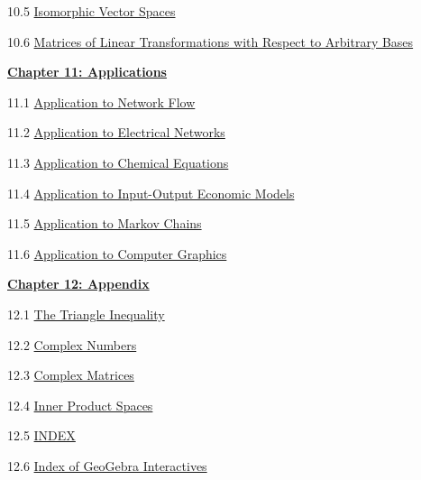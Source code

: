 \documentclass{ximera}
\begin{document}
10.5	\href{https://ximera.osu.edu/linearalgebradzv3/LinearAlgebraInteractiveIntro/LTR-0035/main}{Isomorphic Vector Spaces}
	
10.6	\href{https://ximera.osu.edu/linearalgebradzv3/LinearAlgebraInteractiveIntro/LTR-0060/main}{Matrices of Linear Transformations with Respect to Arbitrary Bases}
		
\href{https://ximera.osu.edu/linearalgebradzv3/LinearAlgebraInteractiveIntro/XLAChapter_applications/main}{\textbf{Chapter 11: Applications}}
	
11.1	\href{https://ximera.osu.edu/linearalgebradzv3/LinearAlgebraInteractiveIntro/APP-0010/main}{Application to Network Flow}
	
11.2	\href{https://ximera.osu.edu/linearalgebradzv3/LinearAlgebraInteractiveIntro/APP-0020/main}{Application to Electrical Networks}
	
11.3	\href{https://ximera.osu.edu/linearalgebradzv3/LinearAlgebraInteractiveIntro/APP-0030/main}{Application to Chemical Equations}
	
11.4	\href{https://ximera.osu.edu/linearalgebradzv3/LinearAlgebraInteractiveIntro/APP-0050/main}{Application to Input-Output Economic Models}
	
11.5	\href{https://ximera.osu.edu/linearalgebradzv3/LinearAlgebraInteractiveIntro/APP-0060/main}{Application to Markov Chains}
	
11.6	\href{https://ximera.osu.edu/linearalgebradzv3/LinearAlgebraInteractiveIntro/APP-0040/main}{Application to Computer Graphics}
	
\href{https://ximera.osu.edu/linearalgebradzv3/LinearAlgebraInteractiveIntro/XLAChapter_appendix/main}{\textbf{Chapter 12: Appendix}}
	
12.1	\href{https://ximera.osu.edu/linearalgebradzv3/LinearAlgebraInteractiveIntro/APX-0010/main}{The Triangle Inequality}
	
12.2	\href{https://ximera.osu.edu/linearalgebradzv3/LinearAlgebraInteractiveIntro/APX-0020/main}{Complex Numbers}
	
12.3
\href{https://ximera.osu.edu/linearalgebradzv3/LinearAlgebraInteractiveIntro/RTH-0050/main}{Complex Matrices}

12.4 \href{https://ximera.osu.edu/linearalgebradzv3/LinearAlgebraInteractiveIntro/LTR-0080/main}{Inner Product Spaces}
	
12.5	\href{https://ximera.osu.edu/linearalgebradzv3/LinearAlgebraInteractiveIntro/INDEX/main}{INDEX}

12.6 \href{https://ximera.osu.edu/linearalgebradzv3/LinearAlgebraInteractiveIntro/APX-0040/main}{Index of GeoGebra Interactives}
\end{document}
